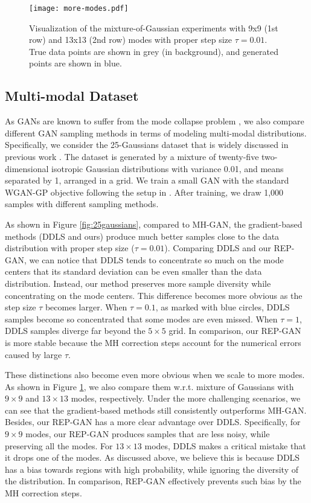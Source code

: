\documentclass[runningheads]{llncs}
\newcommand{\<}{\left\langle}
\renewcommand{\>}{\right\rangle}
\begin{document}
\begin{figure}[t]
    \centering
    \texttt{[image: more-modes.pdf]}
    \caption{Visualization of the mixture-of-Gaussian experiments with 9x9 (1st row) and 13x13 (2nd row) modes with proper step size $\tau=0.01$. True data points are shown in grey (in background), and generated points are shown in blue. }
    \label{fig:more-modes}
\end{figure}


\subsection{Multi-modal Dataset}

As GANs are known to suffer from the mode collapse problem \cite{goodfellow2016nips}, we also compare different GAN sampling methods in terms of modeling multi-modal distributions. Specifically, we consider the 25-Gaussians dataset that is widely discussed in previous work \cite{azadi2019discriminator,turner2019metropolis,che2020your}. The dataset is generated by a mixture of twenty-five two-dimensional isotropic Gaussian distributions with variance 0.01, and means separated by 1, arranged in a grid. We train a small GAN with the standard WGAN-GP objective following the setup in  \cite{tanaka2019discriminator}. After training, we draw 1,000 samples with different sampling methods. 

As shown in Figure \ref{fig:25gaussians}, compared to MH-GAN, the gradient-based methods (DDLS and ours) produce much better samples close to the data distribution with proper step size ($\tau=0.01$). Comparing DDLS and our REP-GAN, we can notice that DDLS tends to concentrate so much on the mode centers that its standard deviation can be even smaller than the data distribution. Instead, our method preserves more sample diversity while concentrating on the mode centers. This difference becomes more obvious as the step size $\tau$ becomes larger. When $\tau=0.1$, as marked with blue circles, DDLS samples become so concentrated that some modes are even missed. When $\tau=1$, DDLS samples diverge far beyond the $5\times5$ grid. 
In comparison, our REP-GAN is more stable because the MH correction steps account for the numerical errors caused by large $\tau$.

These distinctions also become even more obvious when we scale to more modes. As shown in Figure \ref{fig:more-modes}, we also compare them w.r.t. mixture of Gaussians with $9\times9$ and $13\times13$ modes, respectively. Under the more challenging scenarios, we can see that the gradient-based methods still consistently outperforms MH-GAN. Besides, our REP-GAN has a more clear advantage over DDLS. Specifically, for $9\times9$ modes, our REP-GAN produces samples that are less noisy, while preserving all the modes. For $13\times13$ modes, DDLS makes a critical mistake that it drops one of the modes. As discussed above, we believe this is because DDLS has a bias towards regions with high probability, while ignoring the diversity of the distribution. In comparison, REP-GAN effectively prevents such bias by the MH correction steps.
\end{document}
